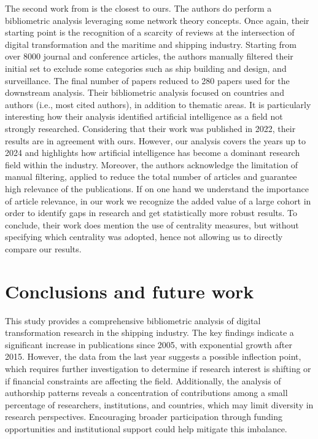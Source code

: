 \documentclass[jmse,review,submit,pdftex,moreauthors]{Definitions/mdpi}
\begin{document}
The second work from \citep{jovic2022digitalization} is the closest to ours. The authors do perform a bibliometric analysis leveraging some network theory concepts. Once again, their starting point is the recognition of a scarcity of reviews at the intersection of digital transformation and the maritime and shipping industry. Starting from over 8000 journal and conference articles, the authors manually filtered their initial set to exclude some categories such as ship building and design, and surveillance. The final number of papers reduced to 280 papers used for the downstream analysis. Their bibliometric analysis focused on countries and authors (i.e., most cited authors), in addition to thematic areas. It is particularly interesting how their analysis identified artificial intelligence as a field not strongly researched. Considering that their work was published in 2022, their results are in agreement with ours. However, our analysis covers the years up to 2024 and highlights how artificial intelligence has become a dominant research field within the industry. Moreover, the authors acknowledge the limitation of manual filtering, applied to reduce the total number of articles and guarantee high relevance of the publications. If on one hand we understand the importance of article relevance, in our work we recognize the added value of a large cohort in order to identify gaps in research and get statistically more robust results. To conclude, their work does mention the use of centrality measures, but without specifying which centrality was adopted, hence not allowing us to directly compare our results.	 

\section{Conclusions and future work}
This study provides a comprehensive bibliometric analysis of digital transformation research in the shipping industry. The key findings indicate a significant increase in publications since 2005, with exponential growth after 2015. However, the data from the last year suggests a possible inflection point, which requires further investigation to determine if research interest is shifting or if financial constraints are affecting the field. Additionally, the analysis of authorship patterns reveals a concentration of contributions among a small percentage of researchers, institutions, and countries, which may limit diversity in research perspectives. Encouraging broader participation through funding opportunities and institutional support could help mitigate this imbalance.
\end{document}
